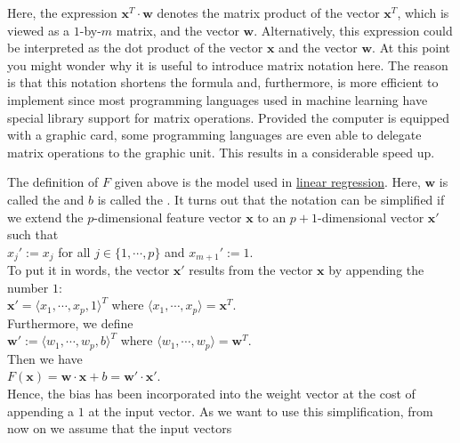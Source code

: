 Here, the expression $\mathbf{x}^T \cdot \mathbf{w}$ denotes the matrix product of the vector
$\mathbf{x}^T$, which is viewed as a $1$-by-$m$ matrix, and the vector $\mathbf{w}$.  Alternatively, this
expression could be interpreted as the dot product of the vector $\mathbf{x}$ and the vector $\mathbf{w}$.
At this point you might wonder why it is useful to introduce matrix notation here.  The reason is
that this notation shortens the formula and, furthermore, is more efficient to implement since most
programming languages used in machine learning have special library support for matrix operations.  
Provided the computer is equipped with a graphic card,  some
programming languages are even able to delegate matrix operations to the graphic unit.  This results in a
considerable speed up.

The definition of $F$ given above is the model used in
\href{https://en.wikipedia.org/wiki/Linear_regression}{linear regression}. 
Here, $\mathbf{w}$ is called the  and $b$ is called the .  It turns
out that the notation can be simplified if we extend the $p$-dimensional feature vector $\mathbf{x}$ to an
$p+1$-dimensional vector $\mathbf{x}'$ such that
\\[0.2cm]
\hspace*{1.3cm}
$x_j' := x_j$ \quad for all $j\in\{1,\cdots,p\}$ \quad and \quad $x_{m+1}' := 1$.
\\[0.2cm]
To put it in words, the vector $\mathbf{x}'$ results from the vector $\mathbf{x}$ by appending the number $1$:
\\[0.2cm]
\hspace*{1.3cm}
$\mathbf{x}' = \langle x_1, \cdots, x_p, 1 \rangle^T$ \quad where $\langle x_1, \cdots, x_p \rangle = \mathbf{x}^T$.
\\[0.2cm]
Furthermore, we define 
\\[0.2cm]
\hspace*{1.3cm}
$\mathbf{w}' := \langle w_1, \cdots, w_p, b \rangle^T$ \quad where $\langle w_1, \cdots, w_p \rangle = \mathbf{w}^T$.
\\[0.2cm]
Then we have
\\[0.2cm]
\hspace*{1.3cm}
$F(\mathbf{x}) = \mathbf{w} \cdot \mathbf{x} + b = \mathbf{w}' \cdot \mathbf{x}'$.
\\[0.2cm]
Hence, the bias has been incorporated into the weight vector at the cost of appending a $1$ at the
input vector.  As we want to use this simplification, from now on we assume that the input vectors
